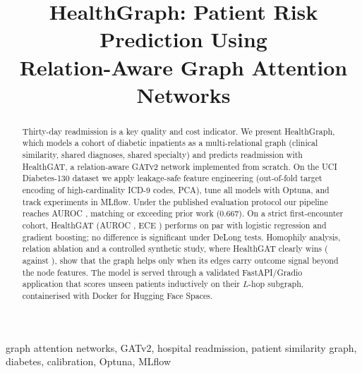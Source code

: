 \documentclass[conference]{IEEEtran}
\begin{document}
\title{HealthGraph: Patient Risk Prediction Using\\Relation-Aware Graph Attention Networks}

\author{
}

\maketitle

\begin{abstract}
Thirty-day readmission is a key quality and cost indicator. We present HealthGraph, which
models a cohort of diabetic inpatients as a multi-relational graph (clinical similarity, shared
diagnoses, shared specialty) and predicts readmission with HealthGAT, a relation-aware GATv2
network implemented from scratch. On the UCI Diabetes-130 dataset we apply leakage-safe feature
engineering (out-of-fold target encoding of high-cardinality ICD-9 codes, PCA), tune all models
with Optuna, and track experiments in MLflow. Under the published evaluation protocol our
pipeline reaches AUROC \benchPOneXGB, matching or exceeding prior work (0.667). On a strict
first-encounter cohort, HealthGAT (AUROC \aurocGAT, ECE \eceGAT) performs on par with logistic
regression and gradient boosting; no difference is significant under DeLong tests. Homophily
analysis, relation ablation and a controlled synthetic study, where HealthGAT clearly wins
(\synGAT{} against \synMLP), show that the graph helps only when its edges carry outcome signal
beyond the node features. The model is served through a validated FastAPI/Gradio application
that scores unseen patients inductively on their $L$-hop subgraph, containerised with Docker for
Hugging Face Spaces.
\end{abstract}

\begin{IEEEkeywords}
graph attention networks, GATv2, hospital readmission, patient similarity graph, diabetes, calibration, Optuna, MLflow
\end{IEEEkeywords}

\end{document}
